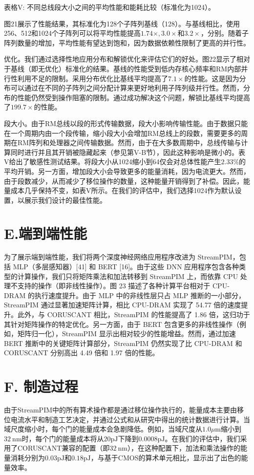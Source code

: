 \documentclass[10pt]{article}
\begin{document}
表格V: 不同总线段大小之间的平均性能和能耗比较（标准化为1024）。

图21展示了性能结果，其标准化为128个子阵列基线（128）。与基线相比，使用256、512和1024个子阵列可以将平均性能提高$1.74 \times, 3.0 \times$和$3.2 \times$，分别。随着子阵列数量的增加，平均性能有望达到饱和，因为数据依赖性限制了更高的并行性。

优化。我们通过选择性地应用分布和解锁优化来评估它们的好处。图22显示了相对于基线（即无优化）标准化的结果。基线的性能受到低内存核心频率和RM内部并行性利用不足的限制。采用分布优化比基线平均提高了$7.1 \times$的性能。这是因为分布可以通过在不同的子阵列之间分配计算来更好地利用子阵列级并行性。然而，分布的性能仍然受到操作阻塞的限制。通过成功解决这个问题，解锁比基线平均提高了$199.7 \times$的性能。

段大小。由于RM总线以段的形式传输数据，段大小影响传输性能。由于数据只能在一个周期内由一个段传输，缩小段大小会增加RM总线上的段数，需要更多的周期在RM阵列和处理器之间传输数据。然而，由于在大多数周期中，总线传输与计算同时进行并且其开销被隐藏起来（参见第V-B节），因此这种影响是微小的。表V给出了敏感性测试结果。将段大小从1024缩小到64仅会对总体性能产生$2.33\%$的平均开销。另一方面，增加段大小会导致更多的能量消耗，因为电流更大。然而，由于段数减少，从而减少了移位操作的数量，这种能量开销得到了补偿。因此，能量成本几乎保持不变，如表V所示。在我们的评估中，我们选择1024作为默认设置，以展示我们设计的最佳性能。

\section*{E.端到端性能}
为了展示端到端性能，我们将两个深度神经网络应用程序改进为 StreamPIM，包括 MLP（多层感知器）[41] 和 BERT [16]。由于这些 DNN 应用程序包含各种类型的计算操作，我们只将矩阵乘法和加法转移到 StreamPIM 上，而依靠 CPU 处理不支持的操作（即非线性操作）。图 23 描述了各种计算平台相对于 CPU-DRAM 的执行速度提升。由于 MLP 中的非线性层只占 MLP 推断的一小部分，StreamPIM 通过显著加速矩阵计算，相比 CPU-DRAM 实现了 54.77 倍的速度提升。此外，与 CORUSCANT 相比，StreamPIM 的性能提高了 1.86 倍，这归功于其针对矩阵操作的特定优化。另一方面，由于 BERT 包含更多的非线性操作（例如，矩阵归一化），StreamPIM 显示出相对较少的性能增益。然而，通过加速 BERT 推断中的关键矩阵计算部分，StreamPIM 仍然实现了比 CPU-DRAM 和 CORUSCANT 分别高出 4.49 倍和 1.97 倍的性能。

\section*{F. 制造过程}
由于StreamPIM中的所有算术操作都是通过移位操作执行的，能量成本主要由移位电流水平和制造工艺决定，并通过公式和从研究中得出的统计数据进行计算。当域尺度缩小时，每个门的能量成本会急剧降低。例如，当域尺度从$1.0\mu \mathrm{m}$缩小到$32 \mathrm{~nm}$时，每个门的能量成本将从$20 \mathrm{pJ}$下降到$0.0008 \mathrm{pJ}$。在我们的评估中，我们采用了CORUSCANT兼容的配置（即$32 \mathrm{~nm}$），在这种配置下，加法和乘法操作的能量消耗分别为$0.03 \mathrm{pJ}$和$0.18 \mathrm{pJ}$，与基于CMOS的算术单元相比，显示出了出色的能量效率。
\end{document}

